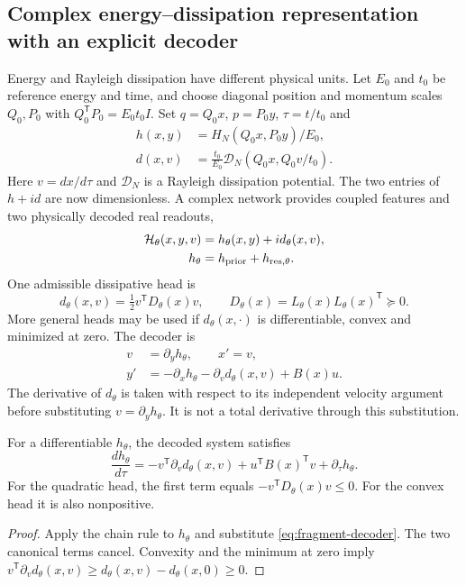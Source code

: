 \subsection{Complex energy--dissipation representation with an explicit decoder}
Energy and Rayleigh dissipation have different physical units. Let $E_0$
and $t_0$ be reference energy and time, and choose diagonal position and
momentum scales $Q_0,P_0$ with $Q_0^{\mathsf T}P_0=E_0t_0I$.
Set $q=Q_0x$, $p=P_0y$, $\tau=t/t_0$ and
\begin{align}
 h(x,y)&=H_N(Q_0x,P_0y)/E_0,\\
 d(x,v)&=\frac{t_0}{E_0}\mathcal D_N(Q_0x,Q_0v/t_0).
\end{align}
Here $v=dx/d\tau$ and $\mathcal D_N$ is a Rayleigh dissipation potential.
The two entries of $h+id$ are now dimensionless. A complex network
provides coupled features and two physically decoded real readouts,
\begin{align}
 \mathcal H_\theta(x,y,v)&=h_\theta(x,y)+i d_\theta(x,v),\\
 h_\theta&=h_{\rm prior}+h_{{\rm res},\theta}.
\end{align}
One admissible dissipative head is
\begin{equation}
 d_\theta(x,v)=\tfrac12v^{\mathsf T}D_\theta(x)v,
 \qquad D_\theta(x)=L_\theta(x)L_\theta(x)^{\mathsf T}\succeq0.
\end{equation}
More general heads may be used if $d_\theta(x,\cdot)$ is differentiable,
convex and minimized at zero. The decoder is
\begin{align}
 v&=\partial_y h_\theta,\qquad x'=v,\\
 y'&=-\partial_x h_\theta-\partial_vd_\theta(x,v)+B(x)u.
 \label{eq:fragment-decoder}
\end{align}
The derivative of $d_\theta$ is taken with respect to its independent
velocity argument before substituting $v=\partial_yh_\theta$.
It is not a total derivative through this substitution.

\begin{proposition}
For a differentiable $h_\theta$, the decoded system satisfies
\begin{equation}
 \frac{d h_\theta}{d\tau}
 =-v^{\mathsf T}\partial_vd_\theta(x,v)
   +u^{\mathsf T}B(x)^{\mathsf T}v+\partial_\tau h_\theta.
 \label{eq:fragment-power}
\end{equation}
For the quadratic head, the first term equals
$-v^{\mathsf T}D_\theta(x)v\le0$. For the convex head it is also
nonpositive.
\end{proposition}
\begin{proof}
Apply the chain rule to $h_\theta$ and substitute
\eqref{eq:fragment-decoder}. The two canonical terms cancel.
Convexity and the minimum at zero imply
$v^{\mathsf T}\partial_vd_\theta(x,v)
\ge d_\theta(x,v)-d_\theta(x,0)\ge0$.
\end{proof}

